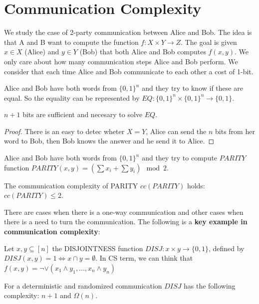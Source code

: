 \section{Communication Complexity}

We study the case of 2-party communication between Alice and Bob. The idea is that A and B want to
compute the function $f:X \times Y \rightarrow Z$. The goal is given $x \in X$ (Alice) and $y \in Y$ (Bob)
that both Alice and Bob computes $f(x,y)$. We only care about how many communication steps Alice and Bob
perform. We consider that each time Alice and Bob communicate to each other a cost of 1-bit.

\begin{example}[EQUALITY]
    Alice and Bob have both words from $\{0,1\}^n$ and they try to know if these are equal. So the equality
    can be represented by $EQ:\{0,1\}^n \times \{0,1\}^n \rightarrow \{0,1\}$.
\end{example}
\begin{proposition}
    $n+1$ bits are sufficient and necesary to solve $EQ$.
\end{proposition}
\begin{proof}
    There is an easy to detec wheter $X = Y$, Alice can send the $n$ bits from her word to Bob,
    then Bob knows the answer and he send it to Alice.
\end{proof}

\begin{example}[PARITY]
    Alice and Bob have both words from $\{0,1\}^n$ and they try to compute $PARITY$ function $PARITY(x,y)= (\sum x_i + \sum y_i) \mod 2$. 
\end{example}
\begin{proposition}
    The communication complexity of PARITY $cc(PARITY)$ holds: $cc(PARITY) \leq 2$.
\end{proposition}

There are cases when there is a one-way communication and other cases when there is a need to turn
the communication. The following is a \textbf{key example in communication complexity}:

\begin{example}[DISJOINTNESS]
    Let $x,y \subseteq [n]$ the DISJOINTNESS function $DISJ:x \times y \rightarrow \{0,1\}$, 
    defined by $DISJ(x,y) = 1 \iff x \cap y = \emptyset$. 
    In CS term, we can think that $f(x,y)= \neg \lor(x_1 \land y_1,...,x_n \land y_n)$
\end{example}


\begin{proposition}
    For a deterministic and randomized communication $DISJ$ has the following complexity:
    $n+1$ and $\Omega(n)$.
\end{proposition}



